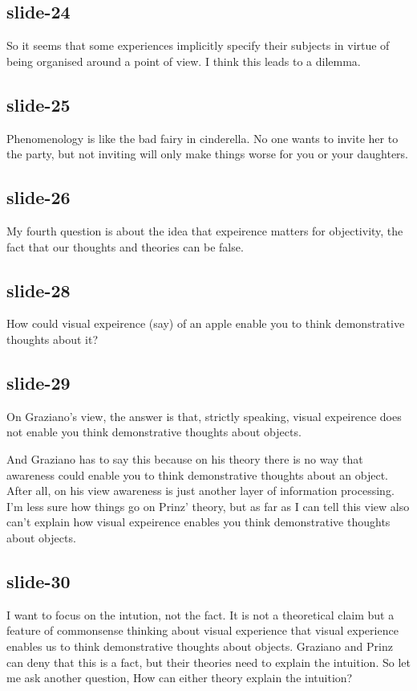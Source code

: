 \documentclass[14pt,\papersize]{extarticle}
\begin{document}
\subsection{slide-24}
So it seems that some experiences implicitly specify their subjects
in virtue of being organised around a point of view.
I think this leads to a dilemma.
 
\subsection{slide-25}
Phenomenology is like the bad fairy in cinderella.
No one wants to invite her to the party, 
but not inviting will only make things worse for you or your daughters.
 
\subsection{slide-26}
My fourth question is about the idea that expeirence matters for objectivity,
the fact that our thoughts and theories can be false.
 
\subsection{slide-28}
How could visual expeirence (say) of an apple enable you to think
demonstrative thoughts about it?
 
\subsection{slide-29}
On Graziano’s view, the answer is that, strictly speaking,
visual expeirence does not 
enable you think demonstrative thoughts about objects.
 
And Graziano has to say this because on his theory there is no way that 
awareness could enable you to think demonstrative thoughts about an
object.  After all, on his view awareness is just another layer of 
information processing.
I'm less sure how things go on Prinz’ theory, but as far as I can tell
this view also can't explain how visual expeirence 
enables you think demonstrative thoughts about objects.
 
\subsection{slide-30}
I want to focus on the intution, not the fact.
It is not a theoretical claim but a feature of commonsense thinking
about visual experience that visual experience enables us to 
think demonstrative thoughts about objects.
Graziano and Prinz can deny that this is a fact, but their theories 
need to explain the intuition.
So let me ask another question,
How can either theory explain the intuition?
 
\end{document}
